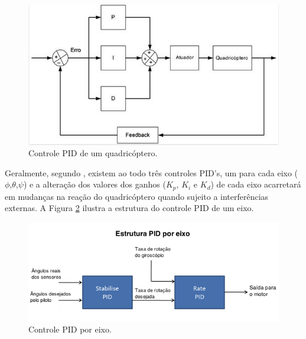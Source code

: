 \documentclass[a4paper, 12pt]{article}
\begin{document}
\begin{figure}[h]
	\centering
		\includegraphics[scale=0.5]{img/PID_quad_geral.png}
	\caption{Controle PID de um quadricóptero.}
	\label{fig:PIDquad}
\end{figure}


Geralmente, segundo \cite{Liang}, existem ao todo três controles PID's, um para cada eixo ($\phi$,$\theta$,$\psi$) e a alteração dos valores dos ganhos ($K_p$, $K_i$ e $K_d$) de cada eixo acarretará em mudanças na reação do quadricóptero quando sujeito a interferências externas. A Figura \ref{fig:PIDaxis} ilustra a estrutura do controle PID de um eixo.



\begin{figure}[h]
	\centering
		\includegraphics[scale=0.6]{img/PID_quad_axis.png}
	\caption{Controle PID por eixo.}
	\label{fig:PIDaxis}
\end{figure}
\end{document}
